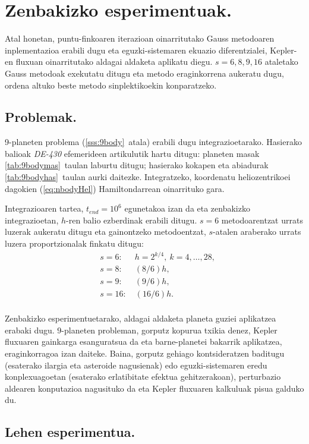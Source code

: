 \section{Zenbakizko esperimentuak.}


Atal honetan, puntu-finkoaren iterazioan oinarritutako Gauss metodoaren inplementazioa erabili dugu eta eguzki-sistemaren ekuazio diferentzialei, Kepler-en fluxuan oinarritutako aldagai aldaketa aplikatu diegu. $s=6,8,9,16$ ataletako Gauss metodoak exekutatu ditugu eta metodo eraginkorrena aukeratu dugu, ordena altuko beste metodo sinplektikoekin konparatzeko. 


\subsection{Problemak.}


9-planeten problema (\ref{sss:9body}~atala) erabili dugu integrazioetarako. Hasierako balioak \emph{DE-430} efemerideen artikulutik hartu ditugu: planeten masak  \ref{tab:9bodymas}~taulan laburtu ditugu; hasierako kokapen eta abiadurak \ref{tab:9bodyhas}~taulan aurki daitezke. Integratzeko, koordenatu heliozentrikoei dagokien (\ref{eq:nbodyHel}) Hamiltondarrean  oinarrituko gara. 

Integrazioaren tartea, $t_{end}=10^6$ egunetakoa izan da eta zenbakizko integrazioetan, $h$-ren balio ezberdinak erabili ditugu. $s=6$ metodoarentzat urrats luzerak aukeratu ditugu eta gainontzeko metodoentzat, $s$-atalen araberako urrats luzera proportzionalak finkatu ditugu:
\begin{align*}
&s=6: \quad  \ \ h=2^{k/4}, \ k=4,\dots,28, \\
&s=8: \quad  \ \ (8/6)h, \\
&s=9: \quad  \ \ (9/6)h, \\
&s=16: \quad (16/6)h. \\
\end{align*} 

Zenbakizko esperimentuetarako, aldagai aldaketa planeta guziei aplikatzea erabaki dugu. $9$-planeten probleman, gorputz kopurua txikia denez,  Kepler fluxuaren gainkarga esanguratsua da eta  barne-planetei bakarrik aplikatzea, eraginkorragoa izan daiteke. Baina, gorputz gehiago kontsideratzen baditugu (esaterako ilargia eta asteroide nagusienak) edo eguzki-sistemaren eredu konplexuagoetan (esaterako erlatibitate efektua gehitzerakoan), perturbazio aldearen konputazioa nagusituko da eta Kepler fluxuaren kalkuluak pisua galduko du. 


\subsection*{Lehen esperimentua.}


